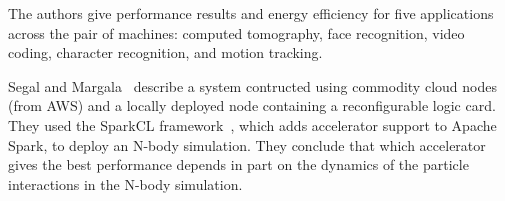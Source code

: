 The authors give performance results and energy efficiency for five
applications across the pair of machines:
computed tomography, face recognition, video coding, character recognition,
and motion tracking.

Segal and Margala~\cite{sm16} describe a system contructed using commodity cloud
nodes (from AWS) and a locally deployed node containing a reconfigurable logic
card.  They used the SparkCL framework~\cite{sparkcl}, which adds accelerator
support to Apache Spark, to deploy an N-body simulation. They conclude that
which accelerator gives the best performance depends in part on the dynamics
of the particle interactions in the N-body simulation.
